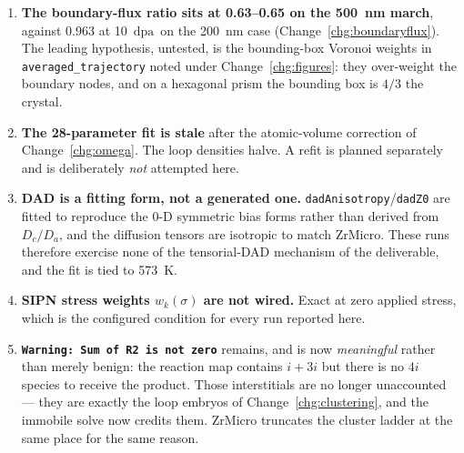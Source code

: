 \documentclass[11pt,a4paper]{article}
\newcommand{\code}[1]{\texttt{\small #1}}
\newcommand{\dpa}{\ensuremath{\mathrm{dpa}}}
\newcommand{\aloop}{\ensuremath{\langle a\rangle}}
\newcounter{chg}
\begin{document}
\begin{enumerate}
\textbf{Not fixed, because it is a physics decision, not a bug in either code.}
Zr3d\_ghoniem is the mass-conserving one: a loop that absorbs a
di-interstitial must remove it from the mobile pool. The reconciling change
belongs in ZrMicro, but it would shift the 0-D fit that the experiments are
calibrated against.

This matters beyond itself: the clustering nucleation flux of
Change~\ref{chg:clustering} is $K C_i C_{3i}$, so a depleted $C_{3i}$ feeds it
directly. The 3-D's own nucleation rate is $0.782\times$ the 0-D's for this
reason, and $0.704/0.782 = 0.90$ --- i.e.\ with the cluster concentrations
matched, the \aloop\ density would land within 10\%. \textbf{Closing this
should close most of what remains on the \aloop\ families as well.}

\item \textbf{The boundary-flux ratio sits at 0.63--0.65 on the 500~nm march},
against 0.963 at 10~\dpa\ on the 200~nm case (Change~\ref{chg:boundaryflux}).
The leading hypothesis, untested, is the bounding-box Voronoi weights in
\code{averaged\_trajectory} noted under Change~\ref{chg:figures}: they
over-weight the boundary nodes, and on a hexagonal prism the bounding box is
$4/3$ the crystal.

\item \textbf{The 28-parameter fit is stale} after the atomic-volume correction
of Change~\ref{chg:omega}. The loop densities halve. A refit is planned
separately and is deliberately \emph{not} attempted here.

\item \textbf{DAD is a fitting form, not a generated one.}
\code{dadAnisotropy}/\code{dadZ0} are fitted to reproduce the 0-D symmetric
bias forms rather than derived from $D_c/D_a$, and the diffusion tensors are
isotropic to match ZrMicro. These runs therefore exercise none of the
tensorial-DAD mechanism of the deliverable, and the fit is tied to 573~K.

\item \textbf{SIPN stress weights $w_k(\sigma)$ are not wired.} Exact at zero
applied stress, which is the configured condition for every run reported here.

\item \textbf{\code{Warning: Sum of R2 is not zero}} remains, and is now
\emph{meaningful} rather than merely benign: the reaction map contains
$i{+}3i$ but there is no $4i$ species to receive the product. Those
interstitials are no longer unaccounted --- they are exactly the loop embryos of
Change~\ref{chg:clustering}, and the immobile solve now credits them. ZrMicro
truncates the cluster ladder at the same place for the same reason.


\end{enumerate}
\end{document}
